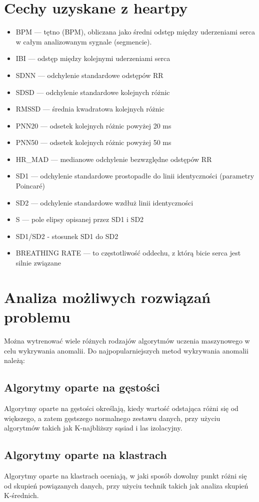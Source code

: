 \documentclass[12pt,a4paper]{article}
\begin{document}
\section{Cechy uzyskane z heartpy}
\begin{itemize}
    \item BPM — tętno (BPM), obliczana jako średni odstęp między uderzeniami serca w całym analizowanym sygnale (segmencie).
    \item IBI — odstęp między kolejnymi uderzeniami serca
    \item SDNN — odchylenie standardowe odstępów RR
    \item SDSD — odchylenie standardowe kolejnych różnic
    \item RMSSD — średnia kwadratowa kolejnych różnic
    \item PNN20 — odsetek kolejnych różnic powyżej 20 ms
    \item PNN50 — odsetek kolejnych różnic powyżej 50 ms
    \item HR\_MAD — medianowe odchylenie bezwzględne odstępów RR
    \item SD1 — odchylenie standardowe prostopadłe do linii identyczności (parametry Poincaré)
    \item SD2 — odchylenie standardowe wzdłuż linii identyczności
    \item S — pole elipsy opisanej przez SD1 i SD2
    \item SD1/SD2 - stosunek SD1 do SD2
    \item BREATHING RATE — to częstotliwość oddechu, z którą bicie serca jest silnie związane
\end{itemize}

\section{Analiza możliwych rozwiązań problemu}
Można wytrenować wiele różnych rodzajów algorytmów uczenia maszynowego w celu wykrywania anomalii. Do najpopularniejszych metod wykrywania anomalii należą:

\subsection{Algorytmy oparte na gęstości}
Algorytmy oparte na gęstości określają, kiedy wartość odstająca różni się od większego, a zatem gęstszego normalnego zestawu danych, przy użyciu algorytmów takich jak K-najbliższy sąsiad i las izolacyjny.

\subsection{Algorytmy oparte na klastrach}
Algorytmy oparte na klastrach oceniają, w jaki sposób dowolny punkt różni się od skupień powiązanych danych, przy użyciu technik takich jak analiza skupień K-średnich.
\end{document}
